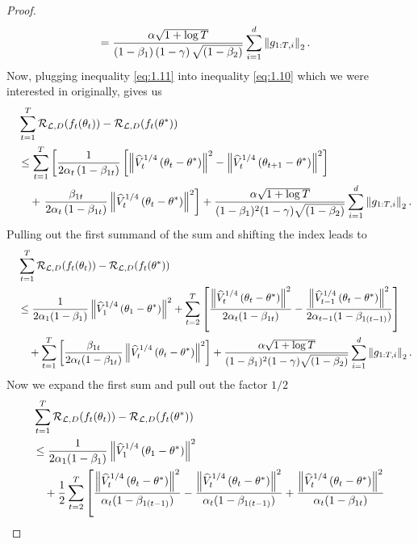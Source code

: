\begin{proof}
\begin{align}
&= \frac{\alpha\sqrt{1 +\log T}}{\left(1-\beta_1\right)\left(1-\operatorname{\gamma}\right)\sqrt{\left(1-\beta_2\right)}} \sum_{i=1}^{d} \left\|g_{1:T,i} \right\|_2.
\end{align}
Now, plugging inequality \eqref{eq:1.11} into inequality \eqref{eq:1.10} which we were interested in originally, gives us
\begin{align*}
&\sum_{t=1}^T \operatorname{\mathcal{R}}_{\operatorname{\mathcal{L}}, D}(f_t(\theta_t)) - \operatorname{\mathcal{R}}_{\operatorname{\mathcal{L}}, D}(f_t(\theta^{\ast}))\\
\quad &\leq \sum_{t=1}^T \left[ \frac{1}{2\alpha_t\left(1-\beta_{1t}\right)} \left[\left\| \widehat{V}_t^{1/4} \left( \theta_t - \theta^{\ast} \right) \right\|^2 - \left\| \widehat{V}_t^{1/4}\left(\theta_{t+1} - \theta^{\ast} \right) \right\|^2 \right]\right.\\
&\quad + \left.\frac{\beta_{1t}}{2\alpha_t \left( 1-\beta_{1t} \right)} \left\| \widehat{V}_t^{1/4}\left(\theta_t -\theta^{\ast} \right) \right\|^2 \right] + \frac{\alpha\sqrt{1 +\log T}}{(1-\beta_1)^2(1-\operatorname{\gamma})\sqrt{(1-\beta_2)}} \sum_{i=1}^{d} \left\|g_{1:T,i} \right\|_2.
\end{align*}
Pulling out the first summand of the sum and shifting the index leads to
\begin{align*}
&\sum_{t=1}^T \operatorname{\mathcal{R}}_{\operatorname{\mathcal{L}}, D}(f_t(\theta_t)) - \operatorname{\mathcal{R}}_{\operatorname{\mathcal{L}}, D}(f_t(\theta^{\ast}))\\
\quad &\leq \frac{1}{2\alpha_1(1-\beta_{1})}\left\| \widehat{V}_1^{1/4} \left( \theta_1 - \theta^{\ast} \right) \right\|^2 + \sum_{t=2}^T \left[ \frac{\left\| \widehat{V}_t^{1/4}\left( \theta_t - \theta^{\ast}\right)\right\|^2}{2\alpha_t(1-\beta_{1t})} - \frac{\left\| \widehat{V}_{t-1}^{1/4}\left(\theta_{t} - \theta^{\ast}\right)\right\|^2}{2\alpha_{t-1}(1-\beta_{1(t-1)})}\right]\\
&\quad + \sum_{t=1}^T \left[\frac{\beta_{1t}}{2\alpha_t (1-\beta_{1t})} \left\| \widehat{V}_t^{1/4}\left(\theta_t -\theta^{\ast} \right) \right\|^2 \right] + \frac{\alpha\sqrt{1 +\log T}}{(1-\beta_1)^2(1-\operatorname{\gamma})\sqrt{(1-\beta_2)}} \sum_{i=1}^{d} \left\|g_{1:T,i} \right\|_2.
\end{align*}
Now we expand the first sum and pull out the factor $1/2$
\begin{align*}
&\sum_{t=1}^T \risk_{\loss, D}(f_t(\t_t)) - \risk_{\loss, D}(f_t(\t^{\ast}))\\
&\leq \frac{1}{2\a_1(1-\b_{1})}\left\| \hat{V}_1^{1/4} \left( \t_1 - \t^{\ast} \right) \right\|^2\\
&\quad + \frac{1}{2}\sum_{t=2}^T \left[ \frac{\left\| \hat{V}_t^{1/4}\left( \t_t - \t^{\ast}\right)\right\|^2}{\a_t(1-\b_{1(t-1)})}
- \frac{\left\| \hat{V}_t^{1/4}\left( \t_t - \t^{\ast}\right)\right\|^2}{\a_t(1-\b_{1(t-1)})}
+ \frac{\left\| \hat{V}_t^{1/4}\left( \t_t - \t^{\ast}\right)\right\|^2}{\a_t(1-\b_{1t})}\right.\\

\end{align*}
\end{proof}
